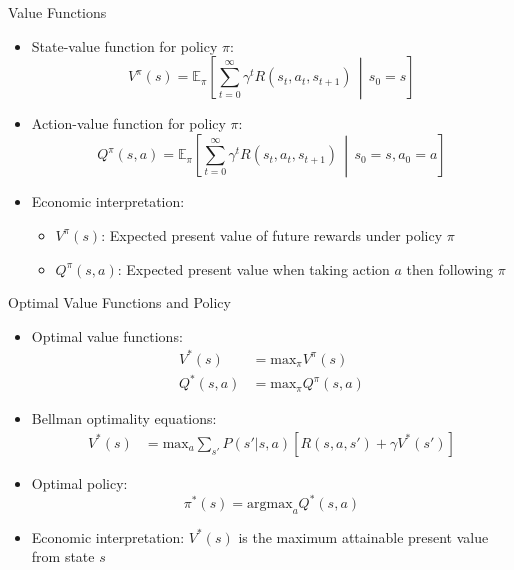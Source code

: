 \documentclass[10pt]{beamer}
\newcommand{\E}{\mathbb{E}}
\renewcommand{\max}{\text{max}}
\newcommand{\argmax}{\text{argmax}}
\begin{document}

\begin{frame}{Value Functions}
    \begin{itemize}
        \item State-value function for policy $\pi$:
        \begin{equation}
            V^{\pi}(s) = \E_{\pi}\left[\sum_{t=0}^{\infty} \gamma^t R(s_t, a_t, s_{t+1}) \,\middle|\, s_0 = s\right]
        \end{equation}
        
        \item Action-value function for policy $\pi$:
        \begin{equation}
            Q^{\pi}(s,a) = \E_{\pi}\left[\sum_{t=0}^{\infty} \gamma^t R(s_t, a_t, s_{t+1}) \,\middle|\, s_0 = s, a_0 = a\right]
        \end{equation}
        
        \item Economic interpretation:
        \begin{itemize}
            \item $V^{\pi}(s)$: Expected present value of future rewards under policy $\pi$
            \item $Q^{\pi}(s,a)$: Expected present value when taking action $a$ then following $\pi$
        \end{itemize}
    \end{itemize}
\end{frame}

\begin{frame}{Optimal Value Functions and Policy}
    \begin{itemize}
        \item Optimal value functions:
        \begin{align}
            V^*(s) &= \max_{\pi} V^{\pi}(s) \\
            Q^*(s,a) &= \max_{\pi} Q^{\pi}(s,a)
        \end{align}
        
        \item Bellman optimality equations:
        \begin{align}
            V^*(s) &= \max_a \sum_{s'} P(s'|s,a) \left[ R(s,a,s') + \gamma V^*(s') \right]
        \end{align}
        
        \item Optimal policy:
        \begin{equation}
            \pi^*(s) = \argmax_a Q^*(s,a)
        \end{equation}
        
        \item Economic interpretation: $V^*(s)$ is the maximum attainable present value from state $s$
    \end{itemize}
\end{frame}
\end{document}
